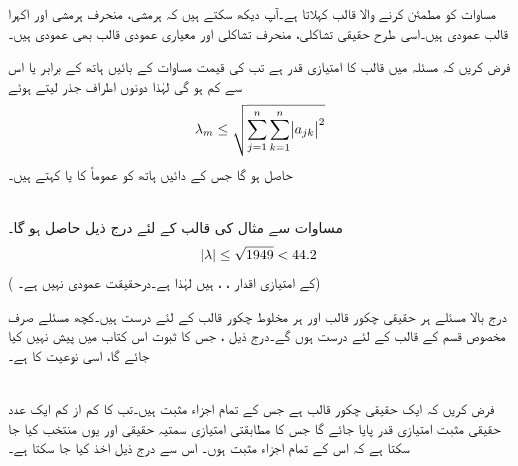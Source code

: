 مساوات  کو مطمئن کرنے والا قالب  کہلاتا ہے۔آپ دیکھ سکتے ہیں کہ ہرمشی، منحرف ہرمشی اور اکہرا قالب عمودی ہیں۔اسی طرح حقیقی تشاکلی، منحرف تشاکلی اور معیاری عمودی قالب بھی عمودی ہیں۔

فرض کریں کہ مسئلہ  میں قالب  کا امتیازی قدر  ہے تب  کی قیمت  مساوات  کے بائیں ہاتھ کے برابر یا اس سے کم ہو گی لہٰذا دونوں اطراف جذر لیتے ہوئے
\begin{align}\label{مساوات_خطی_اعدادی_عدم_شر_پ}
\lambda_m\le \sqrt{ \sum_{j=1}^{n}\sum_{k=1}^{n}\abs{a_{jk}}^2}
\end{align}
حاصل ہو گا جس کے دائیں ہاتھ کو عموماً   کا  یا  کہتے ہیں۔ 

\quad {}\\
مساوات  سے مثال  کی قالب  کے لئے درج ذیل حاصل ہو گا۔
\begin{align*}
\abs{\lambda}\le \sqrt{1949}<44.2
\end{align*}
( کے امتیازی اقدار ، ،  ہیں لہٰذا  ہے۔درحقیقت  عمودی نہیں ہے۔)

درج بالا مسئلے ہر حقیقی چکور قالب اور ہر مخلوط چکور قالب کے لئے درست ہیں۔کچھ مسئلے صرف مخصوص قسم کے قالب کے لئے درست ہوں گے۔درج ذیل ،  جس کا ثبوت اس کتاب میں پیش نہیں کیا جائے گا، اسی نوعیت کا ہے۔ 

\quad {}\\
فرض کریں کہ  ایک حقیقی چکور قالب ہے جس کے تمام اجزاء مثبت ہیں۔تب  کا کم از کم ایک عدد حقیقی مثبت امتیازی قدر پایا جائے گا جس کا مطابقتی امتیازی سمتیہ حقیقی اور یوں منتخب کیا جا سکتا ہے کہ اس کے تمام اجزاء مثبت ہوں۔
اس سے درج ذیل   اخذ کیا جا سکتا ہے۔

